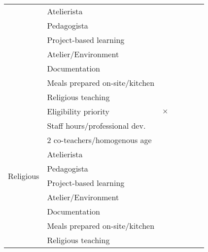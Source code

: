 \begin{tabular}{ c l |  c  c  c c c }
	\cmidrule{2-7}												
	&	Atelierista	&		&		&		&		&		\\
	\cmidrule{2-7}												
	&	Pedagogista	&		&		&		&		&		\\
	\cmidrule{2-7}												
	&	Project-based learning	&		&		&		&		&		\\
	\cmidrule{2-7}												
	&	Atelier/Environment	&		&		&		&		&		\\
	\cmidrule{2-7}												
	&	Documentation	&		&		&		&		&		\\
	\cmidrule{2-7}												
	&	Meals prepared on-site/kitchen	&		&		&		&		&		\\
	\cmidrule{2-7}												
	&	Religious teaching	&		&		&		&		&		\\
	\midrule												
\multirow{19}{*}{Religious}	&	Eligibility priority	&	$\times$	&		&		&		&		\\
	\cmidrule{2-7}												
	&	Staff hours/professional dev.	&	\checkmark	&		&		&		&		\\
	\cmidrule{2-7}												
	&	2 co-teachers/homogenous age	&		&		&		&		&		\\
	\cmidrule{2-7}												
	&	Atelierista	&		&		&		&		&		\\
	\cmidrule{2-7}												
	&	Pedagogista	&	\checkmark	&		&		&		&		\\
	\cmidrule{2-7}												
	&	Project-based learning	&		&		&		&		&		\\
	\cmidrule{2-7}												
	&	Atelier/Environment	&		&		&		&		&		\\
	\cmidrule{2-7}												
	&	Documentation	&	\checkmark	&		&		&		&		\\
	\cmidrule{2-7}												
	&	Meals prepared on-site/kitchen	&		&		&		&		&		\\
	\cmidrule{2-7}												
	&	Religious teaching	&	\checkmark	&		&		&		&		 \\
\bottomrule
\end{tabular}
